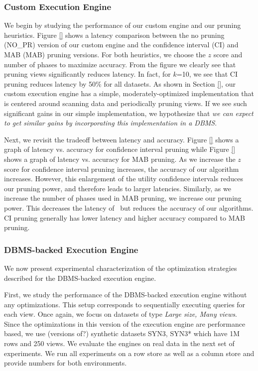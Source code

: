 \subsubsection*{Custom Execution Engine}
We begin by studying the performance of our custom engine and our pruning
heuristics. 
Figure \ref{} shows a latency comparison between the no pruning (NO\_PR) version
of our custom engine and the confidence interval (CI) and MAB (MAB) pruning
versions.
For both heuristics, we choose the $z$ score and number of phases to maximize
accuracy.
From the figure we clearly see that pruning views significantly reduces
latency.
In fact, for $k$=10, we see that CI pruning reduces latency by 50\% for all
datasets.
As shown in Section \ref{}, our custom execution engine has a simple,
moderately-optimized implementation that is centered around scanning data and
periodically pruning views.
If we see such significant gains in our simple implementation, we hypothesize
that {\it we can expect to get similar gains by incorporating this
implementation in a DBMS}.

Next, we revisit the tradeoff between latency and accuracy. 
Figure \ref{} shows a graph of latency vs. accuracy for confidence interval
pruning while Figure \ref{} shows a graph of latency vs. accuracy for MAB
pruning.
As we increase the $z$ score for confidence interval pruning increases, the
accuracy of our algorithm increases.
However, this enlargement of the utility confidence intervals reduces our
pruning power, and therefore leads to larger latencies.
Similarly, as we increase the number of phases used in MAB pruning, we increase
our pruning power. 
This decreases the latency of \SeeDB\ but reduces the accuracy of our
algorithms.
CI pruning generally has lower latency and higher accuracy compared to MAB
pruning. 

\subsubsection*{DBMS-backed Execution Engine}

We now present experimental characterization of the optimization
strategies described for the DBMS-backed execution engine.

First, we study the performance of the DBMS-backed execution engine without any
optimizations. 
This setup corresponds to sequentially executing queries for each view.
Once again, we focus on datasets of type {\it Large size, Many views}.
Since the optimizations in this version of the execution engine are performance
based, we use (versions of?) synthetic datasets SYN3, SYN3* which have 1M rows
and 250 views.
We evaluate the engines on real data in the next set of experiments.
We run all experiments on a row store as well as a column store and provide
numbers for both environments.

